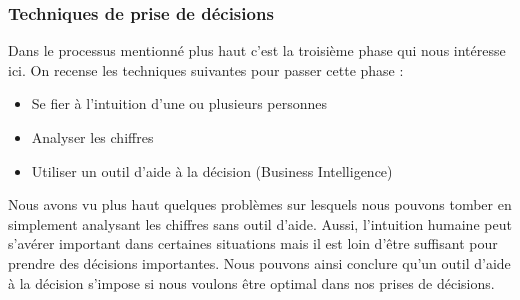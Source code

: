 \subsubsection{Techniques de prise de décisions}
Dans le processus mentionné plus haut c’est la troisième phase qui nous intéresse ici. On recense les techniques suivantes pour passer cette phase :
\begin{itemize}
    \item Se fier à l’intuition d’une ou plusieurs personnes
    \item Analyser les chiffres
    \item Utiliser un outil d’aide à la décision (Business Intelligence)
\end{itemize}

Nous avons vu plus haut quelques problèmes sur lesquels nous pouvons tomber en simplement analysant les chiffres sans outil d’aide. Aussi, l’intuition humaine peut s’avérer important dans certaines situations mais il est loin d’être suffisant pour prendre des décisions importantes. Nous pouvons ainsi conclure qu’un outil d’aide à la décision s’impose si nous voulons être optimal dans nos prises de décisions.

